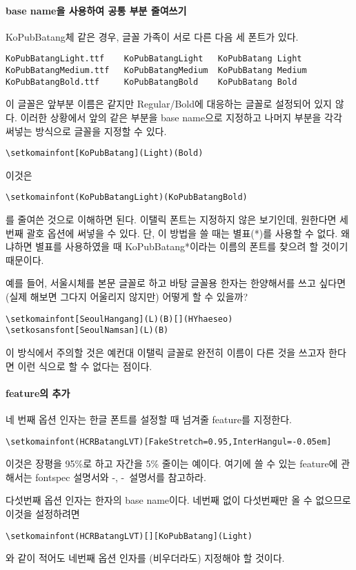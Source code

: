 \documentclass[
	12pt,
	a4paper,
	kosection,
	footnote,
	nobookmarks,
	microtype,
]{oblivoir}
\def\xetexko{\XeTeX-\ko}
\def\luatexko{\LuaTeX-\ko}
\begin{document}
\paragraph{base name을 사용하여 공통 부분 줄여쓰기}
KoPubBatang체 같은 경우, 글꼴 가족이 서로 다른 다음 세 폰트가 있다.
\begin{verbatim}
KoPubBatangLight.ttf    KoPubBatangLight   KoPubBatang Light
KoPubBatangMedium.ttf   KoPubBatangMedium  KoPubBatang Medium
KoPubBatangBold.ttf     KoPubBatangBold    KoPubBatang Bold
\end{verbatim}
이 글꼴은 앞부분 이름은 같지만 Regular/Bold에 대응하는 글꼴로 설정되어 있지 않다.
이러한 상황에서 앞의 같은 부분을 base name으로 지정하고 나머지 부분을 각각 써넣는 방식으로 
글꼴을 지정할 수 있다.
\begin{verbatim}
\setkomainfont[KoPubBatang](Light)(Bold)
\end{verbatim}
이것은
\begin{verbatim}
\setkomainfont(KoPubBatangLight)(KoPubBatangBold)
\end{verbatim}
를 줄여쓴 것으로 이해하면 된다. 이탤릭 폰트는 지정하지 않은 보기인데, 원한다면 세번째 괄호 옵션에
써넣을 수 있다. 단, 이 방법을 쓸 때는 별표(*)를 사용할 수 없다. 왜냐하면 별표를 사용하였을 때
KoPubBatang*이라는 이름의 폰트를 찾으려 할 것이기 때문이다.

예를 들어, 서울시체를 본문 글꼴로 하고 바탕 글꼴용 한자는 한양해서를 쓰고 싶다면(실제 해보면 그다지 어울리지 않지만) 어떻게 할 수 있을까?
\begin{verbatim}
\setkomainfont[SeoulHangang](L)(B)[](HYhaeseo)
\setkosansfont[SeoulNamsan](L)(B)
\end{verbatim}

이 방식에서 주의할 것은 예컨대 이탤릭 글꼴로 완전히 이름이 다른 것을 쓰고자 한다면
이런 식으로 할 수 없다는 점이다.

\paragraph{feature의 추가}
네 번째 옵션 인자는 한글 폰트를 설정할 때 넘겨줄 feature를 지정한다.
\begin{verbatim}
\setkomainfont(HCRBatangLVT)[FakeStretch=0.95,InterHangul=-0.05em]
\end{verbatim}
이것은 장평을 95\%로 하고 자간을 5\% 줄이는 예이다. 여기에 쓸 수 있는 feature에 관해서는
fontspec 설명서와 \xetexko, \luatexko\ 설명서를 참고하라.

다섯번째 옵션 인자는 한자의 base name이다. 네번째 없이 다섯번째만 올 수 없으므로 이것을
설정하려면
\begin{verbatim}
\setkomainfont(HCRBatangLVT)[][KoPubBatang](Light)
\end{verbatim}
와 같이 적어도 네번째 옵션 인자를 (비우더라도) 지정해야 할 것이다.
\end{document}

